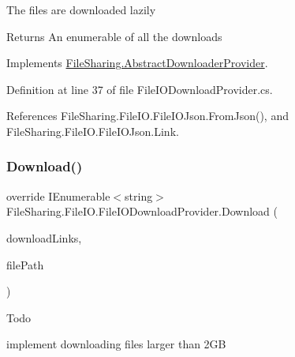 The files are downloaded lazily 

\begin{DoxyReturn}{Returns}
An enumerable of all the downloads
\end{DoxyReturn}


Implements \hyperlink{class_file_sharing_1_1_abstract_downloader_provider_a38b11b25b2acda450d8406ca488585dd}{File\+Sharing.\+Abstract\+Downloader\+Provider}.



Definition at line 37 of file File\+I\+O\+Download\+Provider.\+cs.



References File\+Sharing.\+File\+I\+O.\+File\+I\+O\+Json.\+From\+Json(), and File\+Sharing.\+File\+I\+O.\+File\+I\+O\+Json.\+Link.

\mbox{\label{class_file_sharing_1_1_file_i_o_1_1_file_i_o_download_provider_a8852368c5ed43e3f30def0df9f11841c}} 
\subsubsection{\texorpdfstring{Download()}{Download()}\hspace{0.1cm}{\footnotesize\ttfamily [2/2]}}
{\footnotesize\ttfamily override I\+Enumerable$<$string$>$ File\+Sharing.\+File\+I\+O.\+File\+I\+O\+Download\+Provider.\+Download (\begin{DoxyParamCaption}\item[{I\+Enumerable$<$ string $>$}]{download\+Links,  }\item[{string}]{file\+Path }\end{DoxyParamCaption})\hspace{0.3cm}{\ttfamily [virtual]}}





\begin{DoxyRefDesc}{Todo}
\item[\hyperlink{todo__todo000001}{Todo}]implement downloading files larger than 2\+GB \end{DoxyRefDesc}

